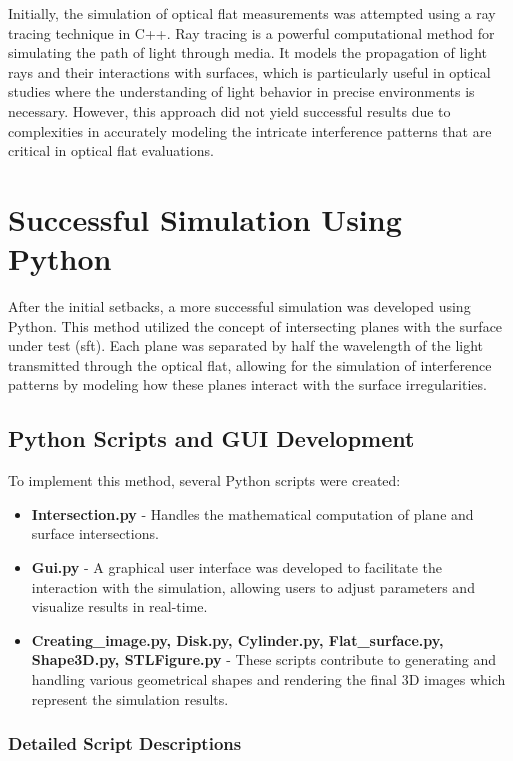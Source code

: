 \documentclass[../main.tex]{subfiles}
\begin{document}
Initially, the simulation of optical flat measurements was attempted using a ray tracing technique in C++. Ray tracing is a powerful computational method for simulating the path of light through media. It models the propagation of light rays and their interactions with surfaces, which is particularly useful in optical studies where the understanding of light behavior in precise environments is necessary. However, this approach did not yield successful results due to complexities in accurately modeling the intricate interference patterns that are critical in optical flat evaluations.

\section{Successful Simulation Using Python}
After the initial setbacks, a more successful simulation was developed using Python. This method utilized the concept of intersecting planes with the surface under test (sft). Each plane was separated by half the wavelength of the light transmitted through the optical flat, allowing for the simulation of interference patterns by modeling how these planes interact with the surface irregularities.

\subsection{Python Scripts and GUI Development}
To implement this method, several Python scripts were created:
\begin{itemize}
    \item \textbf{Intersection.py} - Handles the mathematical computation of plane and surface intersections.
    \item \textbf{Gui.py} - A graphical user interface was developed to facilitate the interaction with the simulation, allowing users to adjust parameters and visualize results in real-time.
    \item \textbf{Creating\_image.py, Disk.py, Cylinder.py, Flat\_surface.py, Shape3D.py, STLFigure.py} - These scripts contribute to generating and handling various geometrical shapes and rendering the final 3D images which represent the simulation results.
\end{itemize}

\subsubsection{Detailed Script Descriptions}
\end{document}
